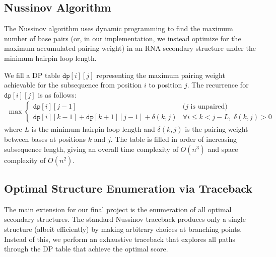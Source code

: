 \documentclass[12pt]{article}
\begin{document}
\subsection{Nussinov Algorithm}
The Nussinov algorithm uses dynamic programming to find the maximum number of base pairs (or, in our implementation, we instead optimize for the maximum accumulated pairing weight) in an RNA secondary structure under the minimum hairpin loop length.

We fill a DP table $\texttt{dp}[i][j]$ representing the maximum pairing weight achievable for the subsequence from position $i$ to position $j$. The recurrence for $\texttt{dp}[i][j]$ is as follows:
\begin{align*}\max \begin{cases}
\texttt{dp}[i][j-1] & \text{($j$ is unpaired)} \\
\texttt{dp}[i][k-1] + \texttt{dp}[k+1][j-1] + \delta(k, j) & \forall i \leq k < j - L,\; \delta(k,j) > 0
\end{cases}
\end{align*}
where $L$ is the minimum hairpin loop length and $\delta(k, j)$ is the pairing weight between bases at positions $k$ and $j$. The table is filled in order of increasing subsequence length, giving an overall time complexity of $O(n^3)$ and space complexity of $O(n^2)$.
\subsection{Optimal Structure Enumeration via Traceback}
The main extension for our final project is the enumeration of all optimal secondary structures. The standard Nussinov traceback produces only a single structure (albeit efficiently) by making arbitrary choices at branching points. Instead of this, we perform an exhaustive traceback that explores all paths through the DP table that achieve the optimal score. 
\end{document}

